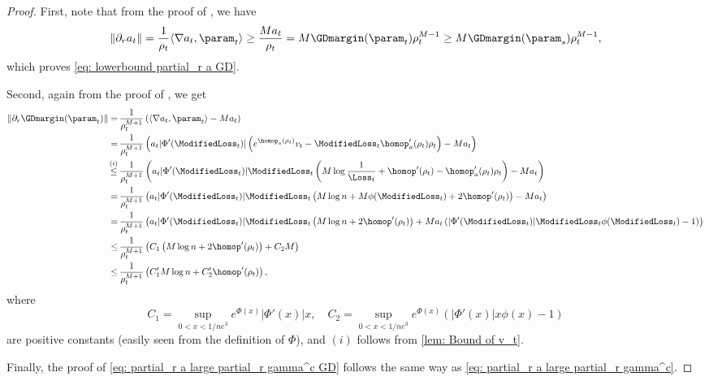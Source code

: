 \begin{proof}
    First, note that from the proof of , we have
    \begin{equation}
        \| \partial_r a_t \| = \frac{1}{\rho_t} \langle \nabla a_t, \param_t \rangle \ge \frac{M a_t}{\rho_t} = M \GDmargin (\param_t) \rho_t^{M - 1} \ge M \GDmargin (\param_s) \rho_t^{M - 1},
    \end{equation}
    which proves \cref{eq: lowerbound partial_r a GD}.

    Second, again from the proof of , we get
    \begin{align*}
        \| \partial_r \GDmargin (\param_t)\| = \, & \frac{1}{\rho_t^{M+1}} \left( \langle \nabla a_t, \param_t \rangle - M a_t \right) \\
        = \, & \frac{1}{\rho_t^{M+1}} \left( a_t \vert \Phi' (\ModifiedLoss_t) \vert \left( e^{\homop_a (\rho_t)} v_t - \ModifiedLoss_t \homop_a' (\rho_t) \rho_t \right) - M a_t \right) \\
        \stackrel{(i)}{\le} \, & \frac{1}{\rho_t^{M+1}} \left( a_t \vert \Phi' (\ModifiedLoss_t) \vert \ModifiedLoss_t \left( M \log \frac{1}{\Loss_t} + \homop'(\rho_t) - \homop_a' (\rho_t) \rho_t \right) - M a_t \right) \\
        = \, & \frac{1}{\rho_t^{M+1}} \left( a_t \vert \Phi' (\ModifiedLoss_t) \vert \ModifiedLoss_t \left( M \log n + M \phi(\ModifiedLoss_t) + 2 \homop'(\rho_t) \right) - M a_t \right) \\
        = \, & \frac{1}{\rho_t^{M+1}} \left( a_t \vert \Phi' (\ModifiedLoss_t) \vert \ModifiedLoss_t \left( M \log n + 2 \homop'(\rho_t) \right) + M a_t \left( \vert \Phi' (\ModifiedLoss_t) \vert \ModifiedLoss_t \phi(\ModifiedLoss_t) - 1 \right) \right)  \\
        \le \, & \frac{1}{\rho_t^{M+1}} \left( C_1 \left( M \log n + 2 \homop'(\rho_t) \right) + C_2 M \right) \\
        \le \, & \frac{1}{\rho_t^{M+1}} \left( C_1' M \log n + C_2' \homop'(\rho_t) \right),
    \end{align*}
    where
    \begin{equation*}
        C_1 = \sup_{0 < x < 1/ne^3} e^{\Phi(x)} \vert \Phi'(x) \vert x, \quad C_2 = \sup_{0 < x < 1/ne^3} e^{\Phi(x)} \left( \vert \Phi' (x) \vert x \phi(x) - 1 \right)
    \end{equation*}
    are positive constants (easily seen from the definition of $\Phi$), and $(i)$ follows from \cref{lem: Bound of v_t}.

    Finally, the proof of \cref{eq: partial_r a large partial_r gamma^c GD} follows the same way as \cref{eq: partial_r a large partial_r gamma^c}.
\end{proof}


